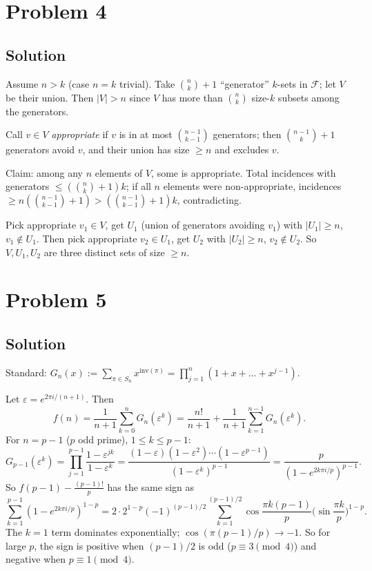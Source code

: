 \documentclass{article}
\begin{document}
\section*{Problem 4}
\subsection*{Solution}
Assume $n > k$ (case $n = k$ trivial). Take $\binom{n}{k}+1$ ``generator'' $k$-sets in $\mathcal{F}$; let $V$ be their union. Then $|V| > n$ since $V$ has more than $\binom{n}{k}$ size-$k$ subsets among the generators.

Call $v \in V$ \emph{appropriate} if $v$ is in at most $\binom{n-1}{k-1}$ generators; then $\binom{n-1}{k}+1$ generators avoid $v$, and their union has size $\ge n$ and excludes $v$.

Claim: among any $n$ elements of $V$, some is appropriate. Total incidences with generators $\le (\binom{n}{k}+1) k$; if all $n$ elements were non-appropriate, incidences $\ge n(\binom{n-1}{k-1}+1) > (\binom{n-1}{k-1}+1) k$, contradicting.

Pick appropriate $v_1 \in V$, get $U_1$ (union of generators avoiding $v_1$) with $|U_1| \ge n$, $v_1 \notin U_1$. Then pick appropriate $v_2 \in U_1$, get $U_2$ with $|U_2| \ge n$, $v_2 \notin U_2$. So $V, U_1, U_2$ are three distinct sets of size $\ge n$.

\section*{Problem 5}
\subsection*{Solution}
Standard: $G_n(x) := \sum_{\pi \in S_n} x^{\mathrm{inv}(\pi)} = \prod_{j=1}^n (1 + x + \dots + x^{j-1})$.

Let $\varepsilon = e^{2\pi i/(n+1)}$. Then
\[ f(n) = \frac{1}{n+1} \sum_{k=0}^{n} G_n(\varepsilon^k) = \frac{n!}{n+1} + \frac{1}{n+1} \sum_{k=1}^{n-1} G_n(\varepsilon^k). \]
For $n = p - 1$ ($p$ odd prime), $1 \le k \le p-1$:
\[ G_{p-1}(\varepsilon^k) = \prod_{j=1}^{p-1} \frac{1 - \varepsilon^{jk}}{1 - \varepsilon^k} = \frac{(1-\varepsilon)(1-\varepsilon^2)\cdots(1-\varepsilon^{p-1})}{(1-\varepsilon^k)^{p-1}} = \frac{p}{(1-e^{2k\pi i/p})^{p-1}}. \]
So $f(p-1) - \frac{(p-1)!}{p}$ has the same sign as
\[ \sum_{k=1}^{p-1} (1 - e^{2k\pi i/p})^{1-p} = 2 \cdot 2^{1-p}(-1)^{(p-1)/2} \sum_{k=1}^{(p-1)/2} \cos\frac{\pi k(p-1)}{p}\Big(\sin\frac{\pi k}{p}\Big)^{1-p}. \]
The $k=1$ term dominates exponentially; $\cos(\pi(p-1)/p) \to -1$. So for large $p$, the sign is positive when $(p-1)/2$ is odd ($p \equiv 3 \pmod 4$) and negative when $p \equiv 1 \pmod 4$.
\end{document}
